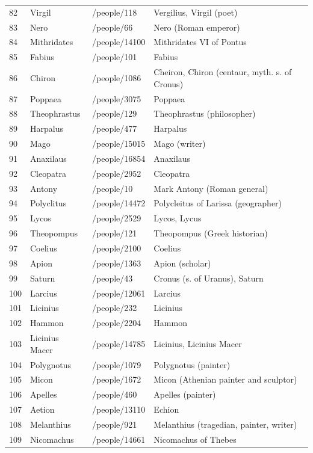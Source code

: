 \documentclass[
  12pt,
]{article}
\begin{document}
\begin{longtable}[]{@{}llll@{}}
82 & Virgil & /people/118 & Vergilius, Virgil (poet) \\
83 & Nero & /people/66 & Nero (Roman emperor) \\
84 & Mithridates & /people/14100 & Mithridates VI of Pontus \\
85 & Fabius & /people/101 & Fabius \\
86 & Chiron & /people/1086 & Cheiron, Chiron (centaur, myth. s. of
Cronus) \\
87 & Poppaea & /people/3075 & Poppaea \\
88 & Theophrastus & /people/129 & Theophrastus (philosopher) \\
89 & Harpalus & /people/477 & Harpalus \\
90 & Mago & /people/15015 & Mago (writer) \\
91 & Anaxilaus & /people/16854 & Anaxilaus \\
92 & Cleopatra & /people/2952 & Cleopatra \\
93 & Antony & /people/10 & Mark Antony (Roman general) \\
94 & Polyclitus & /people/14472 & Polycleitus of Larissa (geographer) \\
95 & Lycos & /people/2529 & Lycos, Lycus \\
96 & Theopompus & /people/121 & Theopompus (Greek historian) \\
97 & Coelius & /people/2100 & Coelius \\
98 & Apion & /people/1363 & Apion (scholar) \\
99 & Saturn & /people/43 & Cronus (s. of Uranus), Saturn \\
100 & Larcius & /people/12061 & Larcius \\
101 & Licinius & /people/232 & Licinius \\
102 & Hammon & /people/2204 & Hammon \\
103 & Licinius Macer & /people/14785 & Licinius, Licinius Macer \\
104 & Polygnotus & /people/1079 & Polygnotus (painter) \\
105 & Micon & /people/1672 & Micon (Athenian painter and sculptor) \\
106 & Apelles & /people/460 & Apelles (painter) \\
107 & Aetion & /people/13110 & Echion \\
108 & Melanthius & /people/921 & Melanthius (tragedian, painter,
writer) \\
109 & Nicomachus & /people/14661 & Nicomachus of Thebes \\

\end{longtable}
\end{document}
